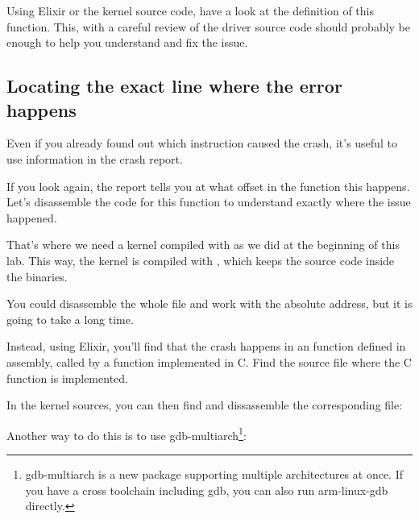 Using Elixir or the kernel source code, have a look at the definition of this
function. This, with a careful review of the driver source code should
probably be enough to help you understand and fix the issue.

\subsection{Locating the exact line where the error happens}

Even if you already found out which instruction caused the crash, it's
useful to use information in the crash report.

If you look again, the report tells you at what offset in the function
this happens. Let's disassemble the code for this function to
understand exactly where the issue happened.

That's where we need a kernel compiled with 
as we did at the beginning of this lab. This way, the kernel is
compiled with , which keeps the source
code inside the binaries.

You could disassemble the whole  file and work with
the  absolute address, but it is going to take a long time.

Instead, using Elixir, you'll find that the crash happens in an function
defined in assembly, called by a function implemented in C. Find
the  source file where the C function is implemented.

In the kernel sources, you can then find
and dissassemble the corresponding  file:

\if{}\fi
\if{}\fi

Another way to do this is to use {gdb-multiarch}\footnote{gdb-multiarch is a new package
supporting multiple architectures at once. If you have a cross
toolchain including gdb, you can also run arm-linux-gdb directly.}:

\if{}\fi
\if{}\fi

